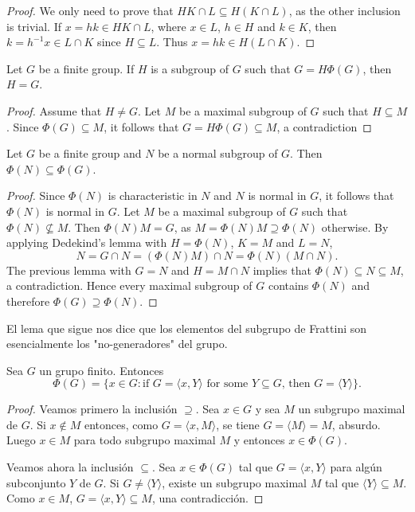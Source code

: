 \begin{proof}
	We only need to prove that $HK\cap L\subseteq H(K\cap L)$, 
	as the other inclusion is trivial. If 
	$x=hk\in HK\cap L$, where $x\in L$, $h\in H$ and $k\in K$,
	then $k=h^{-1}x\in L\cap K$ since $H\subseteq L$. Thus $x=hk\in H(L\cap
	K)$.
\end{proof}

\begin{lemma}
	\label{lem:G=HPhi(G)}
	Let $G$ be a finite group. If $H$ is a subgroup of $G$ such that $G=H\Phi(G)$,
	then $H=G$.
\end{lemma}

\begin{proof}
	Assume that $H\ne G$. Let $M$ be a maximal subgroup of $G$ such that
	$H\subseteq M$. Since $\Phi(G)\subseteq M$, it follows that $G=H\Phi(G)\subseteq M$, a contradiction
\end{proof}

\begin{proposition}
	\label{pro:phi(N)phi(G)}
	Let $G$ be a finite group and $N$ be a normal subgroup of $G$. Then $\Phi(N)\subseteq\Phi(G)$.
\end{proposition}

\begin{proof}
	Since $\Phi(N)$ is characteristic in $N$ and $N$ is normal in $G$, it follows that 
	$\Phi(N)$
	is normal in $G$.  Let $M$ be a maximal subgroup of $G$ such that 
	$\Phi(N)\not\subseteq M$.  Then $\Phi(N)M=G$, as 
	$M=\Phi(N)M\supseteq\Phi(N)$ otherwise. By applying Dedekind's lemma with 
	$H=\Phi(N)$, $K=M$ and $L=N$,   
	\[
		N=G\cap N=(\Phi(N)M)\cap N=\Phi(N)(M\cap N).
	\]
	The previous lemma with $G=N$ and $H=M\cap N$ implies that $\Phi(N)\subseteq
	N\subseteq M$, a contradiction. Hence every maximal subgroup of $G$ 
	contains $\Phi(N)$ and therefore $\Phi(G)\supseteq\Phi(N)$. 
\end{proof}

El lema que sigue nos dice que los elementos del subgrupo de Frattini son esencialmente
los "no-generadores" del grupo. 

\begin{lemma}
	\label{lemma:nongenerators}
	Sea $G$ un grupo finito. Entonces 
	\[
	\Phi(G)=\{x\in G:\text{if $G=\langle x,Y\rangle$ for some $Y\subseteq G$, then $G=\langle Y\rangle$}\}.
	\]
\end{lemma}

\begin{proof}
	Veamos primero la inclusión $\supseteq$.  Sea $x\in G$ y sea $M$ un
	subgrupo maximal de $G$.  Si $x\not\in M$ entonces, como $G=\langle
	x,M\rangle$, se tiene $G=\langle M\rangle=M$, absurdo. Luego $x\in M$ para
	todo subgrupo maximal $M$ y entonces $x\in \Phi(G)$. 

	Veamos ahora la inclusión $\subseteq$. Sea $x\in\Phi(G)$ tal que $G=\langle
	x,Y\rangle$ para algún subconjunto $Y$ de $G$. Si $G\ne \langle Y\rangle$,
	existe un subgrupo maximal $M$ tal que $\langle Y\rangle\subseteq M$. Como
	$x\in M$, $G=\langle x,Y\rangle\subseteq M$, una contradicción.
\end{proof}

